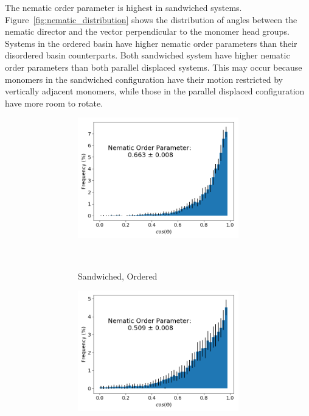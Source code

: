 \documentclass{article}
\begin{document}
  The nematic order parameter is highest in sandwiched systems. 
  Figure~\ref{fig:nematic_distribution} shows the distribution of angles between
  the nematic director and the vector perpendicular to the monomer head groups. 
  Systems in the ordered basin have higher nematic order parameters than their
  disordered basin counterparts. Both sandwiched system have higher nematic order
  parameters than both parallel displaced systems. This may occur because monomers
  in the sandwiched configuration have their motion restricted by vertically adjacent
  monomers, while those in the parallel displaced configuration have more room to 
  rotate.
  
  \clearpage

  \begin{figure}[!htb]
  \begin{subfigure}{\linewidth}
        \centering
        \begin{subfigure}{0.45\linewidth}
                \centering
                \includegraphics[width=\linewidth]{layered_nematic_order.png}
                \caption{Sandwiched, Ordered}~\label{fig:sandwich_nematic}
        \end{subfigure}%
        \begin{subfigure}{0.45\linewidth}
                \centering
                \includegraphics[width=\linewidth]{offset_nematic_order.png}

\end{subfigure}
\end{subfigure}
\end{figure}
\end{document}
